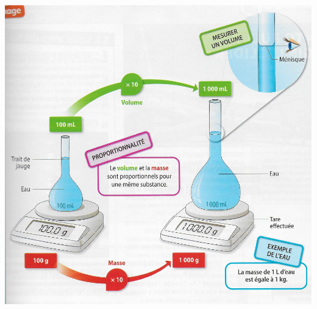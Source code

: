 \documentclass[12pt,a4paper]{article}
\begin{document}
\begin{center}
	\includegraphics[scale=0.3]{img/bilan}
\end{center}

\appendix

\newpage
\end{document}
